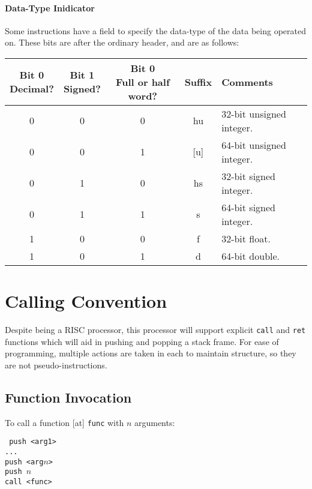 \documentclass{article}
\begin{document}
\paragraph{Data-Type Inidicator}
Some instructions have a field to specify the data-type of the data being operated on.
These bits are after the ordinary header, and are as follows:

\bigskip
\begin{tabular}{|c|c|c||c|l|}
    \hline
    \makecell[c]{\textbf{Bit 0}\\Decimal?} & \makecell[c]{\textbf{Bit 1}\\Signed?} & \makecell[c]{\textbf{Bit 0}\\Full or half word?} & \textbf{Suffix} & \textbf{Comments} \\
    \hline
    0 & 0 & 0 & hu & 32-bit unsigned integer. \\
    \hline
    0 & 0 & 1 & [u] & 64-bit unsigned integer. \\
    \hline
    0 & 1 & 0 & hs & 32-bit signed integer. \\
    \hline
    0 & 1 & 1 & s & 64-bit signed integer. \\
    \hline
    1 & 0 & 0 & f & 32-bit float. \\
    \hline
    1 & 0 & 1 & d & 64-bit double. \\
    \hline
\end{tabular}

\section{Calling Convention}

Despite being a RISC processor, this processor will support explicit \texttt{call} and \texttt{ret} functions which will aid in pushing and popping a stack frame.
For ease of programming, multiple actions are taken in each to maintain structure, so they are not pseudo-instructions.

\subsection{Function Invocation}

To call a function [at] \texttt{func} with \(n\) arguments:

\medskip
\texttt{%
push <arg1>\\%
...\\%
push <arg\(n\)>\\%
push \(n\)\\%
call <func>
}
\end{document}
